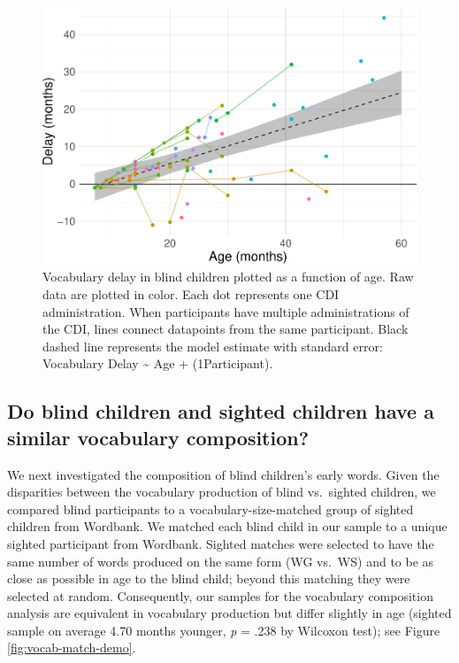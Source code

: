 \documentclass[
  man,floatsintext]{apa6}
\begin{document}
\begin{figure}
\centering
\includegraphics{VI_CDI_manuscript_files/figure-latex/longitudinal-plot-1.pdf}
\caption{\label{fig:longitudinal-plot}Vocabulary delay in blind children plotted as a function of age. Raw data are plotted in color. Each dot represents one CDI administration. When participants have multiple administrations of the CDI, lines connect datapoints from the same participant. Black dashed line represents the model estimate with standard error: Vocabulary Delay \textasciitilde{} Age + (1\textbar Participant).}
\end{figure}

\hypertarget{do-blind-children-and-sighted-children-have-a-similar-vocabulary-composition}{%
\subsection{Do blind children and sighted children have a similar vocabulary composition?}\label{do-blind-children-and-sighted-children-have-a-similar-vocabulary-composition}}

We next investigated the composition of blind children's early words. Given the disparities between the vocabulary production of blind vs.~sighted children, we compared blind participants to a vocabulary-size-matched group of sighted children from Wordbank. We matched each blind child in our sample to a unique sighted participant from Wordbank. Sighted matches were selected to have the same number of words produced on the same form (WG vs.~WS) and to be as close as possible in age to the blind child; beyond this matching they were selected at random. Consequently, our samples for the vocabulary composition analysis are equivalent in vocabulary production but differ slightly in age (sighted sample on average 4.70 months younger, \emph{p} = .238 by Wilcoxon test); see Figure \ref{fig:vocab-match-demo}.
\end{document}
